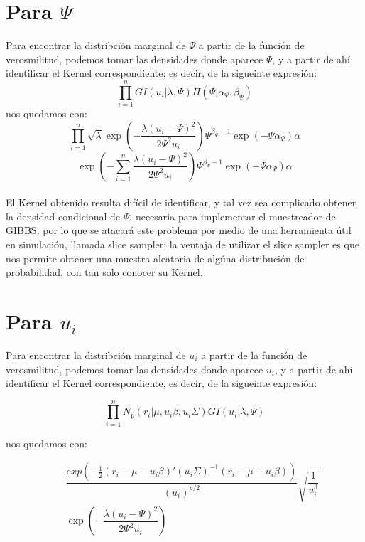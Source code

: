 \section{Para $\Psi$}
Para encontrar la distribción marginal de $\Psi$ a partir de la función de verosmilitud, podemos tomar las densidades donde aparece $\Psi$, y a partir de ahí identificar el Kernel correspondiente; es decir, de la sigueinte expresión:
\begin{equation*}
	\prod_{i=1}^{n}GI(u_{i}|\lambda,\Psi)\Pi(\Psi|\alpha_{\Psi},\beta_{\Psi})
\end{equation*}
nos quedamos con:
\begin{equation*}
	\prod_{i=1}^{n}\sqrt{\lambda}\exp(-\frac{\lambda(u_{i}-\Psi)^{2}}{2\Psi^{2}u_{i}})\Psi^{\beta_{\Psi}-1}\exp(-\Psi\alpha_{\Psi}) \alpha
\end{equation*}
\begin{equation*}
\exp(-\sum_{i=1}^{n}\frac{\lambda(u_{i}-\Psi)^{2}}{2\Psi^{2}u_{i}})\Psi^{\beta_{\Psi}-1}\exp(-\Psi\alpha_{\Psi}) \alpha
\end{equation*}
\\
El Kernel obtenido resulta difícil de identificar, y tal vez sea complicado obtener la densidad condicional  de $\Psi$, necesaria para implementar el muestreador de GIBBS; por lo que se atacará este problema por medio de una herramienta útil en simulación, llamada slice sampler; la ventaja de utilizar el slice sampler es que nos permite obtener una muestra aleatoria de algúna distribución de probabilidad, con tan solo conocer su Kernel.


\section{Para $u_{i}$}
Para encontrar la distribción marginal de $u_{i}$ a partir de la función de verosmilitud, podemos tomar las densidades donde aparece $u_{i}$, y a partir de ahí identificar el Kernel correspondiente, es decir, de la sigueinte expresión:

\begin{equation*}
\prod_{i=1}^{n}N_{p}(r_{i}|\mu,u_{i}\beta,u_{i}\Sigma)GI(u_{i}|\lambda,\Psi)
\end{equation*}

nos quedamos con:

\begin{eqnarray*}
& &\dfrac{exp(-\frac{1}{2}(r_{i}-\mu-u_{i}\beta)'(u_{i}\Sigma)^{-1}(r_{i}-\mu-u_{i}\beta))}{(u_{i})^{p/2}}\sqrt{\dfrac{1}{u_{i} ^{3}}} \\
& & \exp(-\dfrac{\lambda(u_{i}-\Psi)^{2}}{2\Psi^{2}u_{i}})
 \\
\end{eqnarray*}

